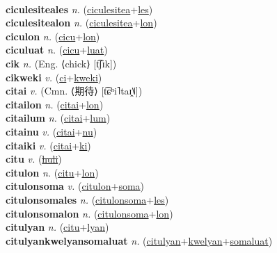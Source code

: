  \label{ciculesitea} \\
\textbf{ciculesiteales} \textit{n.} (\hyperref[ciculesitea]{ciculesitea}+\hyperref[les]{les})
 \label{ciculesiteales} \\
\textbf{ciculesitealon} \textit{n.} (\hyperref[ciculesitea]{ciculesitea}+\hyperref[lon]{lon})
 \label{ciculesitealon} \\
\textbf{ciculon} \textit{n.} (\hyperref[cicu]{cicu}+\hyperref[lon]{lon})
 \label{ciculon} \\
\textbf{ciculuat} \textit{n.} (\hyperref[cicu]{cicu}+\hyperref[luat]{luat})
 \label{ciculuat} \\
\textbf{cik} \textit{n.} (Eng. ⟨chick⟩ [t͡ʃɪk])
 \label{cik} \\
\textbf{cikweki} \textit{v.} (\hyperref[ci]{ci}+\hyperref[kweki]{kweki})
 \label{cikweki} \\
\textbf{citai} \textit{v.} (Cmn. ⟨期待⟩ [t͡ɕʰi˥taɪ̯˥˩])
 \label{citai} \\
\textbf{citailon} \textit{n.} (\hyperref[citai]{citai}+\hyperref[lon]{lon})
 \label{citailon} \\
\textbf{citailum} \textit{n.} (\hyperref[citai]{citai}+\hyperref[lum]{lum})
 \label{citailum} \\
\textbf{citainu} \textit{v.} (\hyperref[citai]{citai}+\hyperref[nu]{nu})
 \label{citainu} \\
\textbf{citaiki} \textit{v.} (\hyperref[citai]{citai}+\hyperref[ki]{ki})
 \label{citaiki} \\
\textbf{citu} \textit{v.} (\hyperref[huli]{\sout{huli}})
 \label{citu} \\
\textbf{citulon} \textit{n.} (\hyperref[citu]{citu}+\hyperref[lon]{lon})
 \label{citulon} \\
\textbf{citulonsoma} \textit{v.} (\hyperref[citulon]{citulon}+\hyperref[soma]{soma})
 \label{citulonsoma} \\
\textbf{citulonsomales} \textit{n.} (\hyperref[citulonsoma]{citulonsoma}+\hyperref[les]{les})
 \label{citulonsomales} \\
\textbf{citulonsomalon} \textit{n.} (\hyperref[citulonsoma]{citulonsoma}+\hyperref[lon]{lon})
 \label{citulonsomalon} \\
\textbf{citulyan} \textit{n.} (\hyperref[citu]{citu}+\hyperref[lyan]{lyan})
 \label{citulyan} \\
\textbf{citulyankwelyansomaluat} \textit{n.} (\hyperref[citulyan]{citulyan}+\hyperref[kwelyan]{kwelyan}+\hyperref[somaluat]{somaluat})
 \label{citulyankwelyansomaluat} \\
